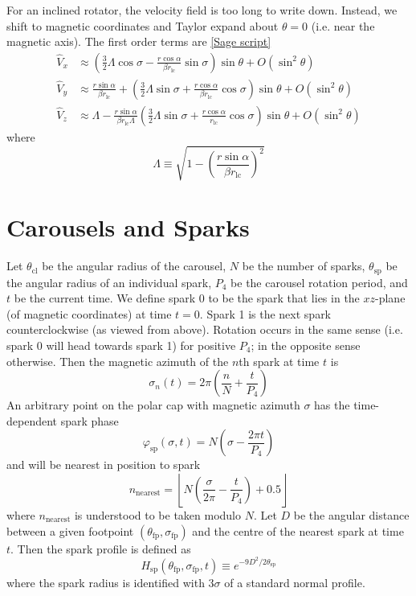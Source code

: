\documentclass{book}
\newcommand{\phase}{\varphi}
\newcommand{\rL}{r_\text{lc}} %
\newcommand{\linktosage}[1]{\hyperref[#1]{[Sage script]}}
\begin{document}
For an inclined rotator, the velocity field is too long to write down.
Instead, we shift to magnetic coordinates and Taylor expand about $\theta = 0$ (i.e. near the magnetic axis).
The first order terms are \linktosage{sage:V_taylor}
\begin{align}
    \hat{V}_x &\approx \left(\frac32\Lambda\cos\sigma -
                    \frac{r\cos\alpha}{\beta \rL}\sin\sigma \right) \sin\theta + O(\sin^2\theta) \\
    \hat{V}_y &\approx \frac{r\sin\alpha}{\beta \rL} +
               \left(\frac32\Lambda\sin\sigma +
                    \frac{r\cos\alpha}{\beta \rL}\cos\sigma \right) \sin\theta + O(\sin^2\theta) \\
    \hat{V}_z &\approx \Lambda - \frac{r\sin\alpha}{\beta \rL\Lambda}\left(\frac32\Lambda\sin\sigma +
                    \frac{r\cos\alpha}{\rL}\cos\sigma \right) \sin\theta + O(\sin^2\theta)
\end{align}
where
\begin{equation}
    \Lambda \equiv \sqrt{1-\left(\frac{r\sin\alpha}{\beta \rL}\right)^2}
\end{equation}

\section{Carousels and Sparks}
\label{sec:carousel}

Let $\theta_\text{cl}$ be the angular radius of the carousel, $N$ be the number of sparks, $\theta_\text{sp}$ be the angular radius of an individual spark, $P_4$ be the carousel rotation period, and $t$ be the current time.
We define spark $0$ to be the spark that lies in the $xz$-plane (of magnetic coordinates) at time $t=0$.
Spark 1 is the next spark counterclockwise (as viewed from above).
Rotation occurs in the same sense (i.e. spark 0 will head towards spark 1) for positive $P_4$; in the opposite sense otherwise.
Then the magnetic azimuth of the $n$th spark at time $t$ is
\begin{equation}
    \sigma_n(t) = 2\pi\left(\frac{n}{N} + \frac{t}{P_4}\right)
\end{equation}
An arbitrary point on the polar cap with magnetic azimuth $\sigma$ has the time-dependent spark phase
\begin{equation}
    \phase_\text{sp}(\sigma,t) = N\left(\sigma - \frac{2\pi t}{P_4}\right)
\end{equation}
and will be nearest in position to spark
\begin{equation}
    n_\text{nearest} = \left\lfloor N\left(\frac{\sigma}{2\pi} - \frac{t}{P_4}\right) + 0.5 \right\rfloor
\end{equation}
where $n_\text{nearest}$ is understood to be taken modulo $N$.
Let $D$ be the angular distance between a given footpoint $(\theta_\text{fp},\sigma_\text{fp})$ and the centre of the nearest spark at time $t$.
Then the spark profile is defined as
\begin{equation}
    H_\text{sp}(\theta_\text{fp},\sigma_\text{fp},t) \equiv e^{-9D^2/2\theta_\text{sp}}
\end{equation}
where the spark radius is identified with $3\sigma$ of a standard normal profile.
\end{document}
